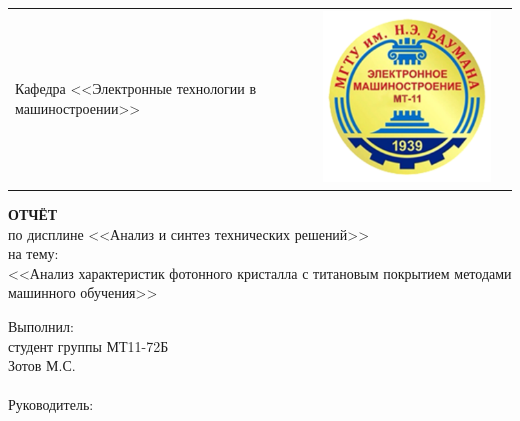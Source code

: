 \documentclass[../template.tex]{subfiles}
\begin{document}
\begin{titlepage}
\begin{center}
\begin{tabular}{C{3cm}C{10cm}C{3cm}}
{		Кафедра <<Электронные технологии в машиностроении>>}&\includegraphics[width=\linewidth]{../images/titul/mt11.png}
	\end{tabular}
\end{center}
		\vspace{2em}
		\begin{center}
			{\Large \bfseries ОТЧЁТ}\\
			по дисплине
			<<Анализ и синтез технических решений>>\\
			на тему:\\
			<<Анализ характеристик фотонного кристалла с титановым покрытием методами машинного обучения>>
		\end{center}
		\vspace{1em}
		\newbox{\lbox}
		\newlength{\maxl}
		\setlength{\maxl}{\wd\lbox}
		\hfill\parbox{11cm}
		{
			\hspace*{5cm}Выполнил:\hfill\\
			\hspace*{5cm}студент группы МТ11-72Б \hfill\\
			\hspace*{5cm}Зотов М.С.\hfill\\\\
			\hspace*{5cm}Руководитель:\hfill\\
}
\end{titlepage}
\end{document}
